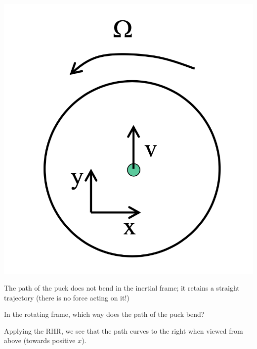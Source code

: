 \begin{center}
    \includegraphics[scale=0.3]{Lecture-15/w15-img3.png}
\end{center}
\begin{s}
The path of the puck does not bend in the inertial frame; it retains a straight trajectory (there is no force acting on it!)
\end{s}
\noindent In the rotating frame, which way does the path of the puck bend?
\begin{s}
Applying the RHR, we see that the path curves to the right when viewed from above (towards positive $x$).
\end{s}